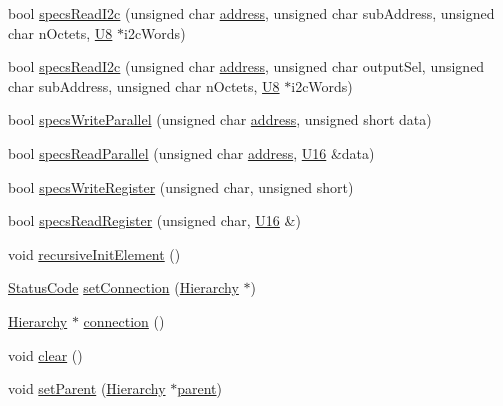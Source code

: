 \begin{DoxyCompactItemize}
\item 
bool \hyperlink{classSpecsInterface_acbc22fab91e3dbd33f83b324750baa1f}{specs\+Read\+I2c} (unsigned char \hyperlink{classSpecsInterface_a0fa039a15b842a5ba783ce825b9915d8}{address}, unsigned char sub\+Address, unsigned char n\+Octets, \hyperlink{ICECALv3_8h_a3cb25ca6f51f003950f9625ff05536fc}{U8} $\ast$i2c\+Words)
\item 
bool \hyperlink{classSpecsInterface_ad27047eaae1bc333ee0c1a6c871a407b}{specs\+Read\+I2c} (unsigned char \hyperlink{classSpecsInterface_a0fa039a15b842a5ba783ce825b9915d8}{address}, unsigned char output\+Sel, unsigned char sub\+Address, unsigned char n\+Octets, \hyperlink{ICECALv3_8h_a3cb25ca6f51f003950f9625ff05536fc}{U8} $\ast$i2c\+Words)
\item 
bool \hyperlink{classSpecsInterface_a232c39e46091c493ad9d061428dd2a8b}{specs\+Write\+Parallel} (unsigned char \hyperlink{classSpecsInterface_a0fa039a15b842a5ba783ce825b9915d8}{address}, unsigned short data)
\item 
bool \hyperlink{classSpecsInterface_aefbe6b92a9f9e2f00bf41dd8b2605c05}{specs\+Read\+Parallel} (unsigned char \hyperlink{classSpecsInterface_a0fa039a15b842a5ba783ce825b9915d8}{address}, \hyperlink{ICECALv3_8h_adf928e51a60dba0df29d615401cc55a8}{U16} \&data)
\item 
bool \hyperlink{classSpecsInterface_ab70adfa5ad87097469c7485126a3c61a}{specs\+Write\+Register} (unsigned char, unsigned short)
\item 
bool \hyperlink{classSpecsInterface_a87080bb575d1b9d0bb313c48e7d3f59a}{specs\+Read\+Register} (unsigned char, \hyperlink{ICECALv3_8h_adf928e51a60dba0df29d615401cc55a8}{U16} \&)
\item 
void \hyperlink{classElement_a3c0abcb36f8906688bb7e32608df7086}{recursive\+Init\+Element} ()
\item 
\hyperlink{classStatusCode}{Status\+Code} \hyperlink{classElement_ab476b4b1df5954141ceb14f072433b89}{set\+Connection} (\hyperlink{classHierarchy}{Hierarchy} $\ast$)
\item 
\hyperlink{classHierarchy}{Hierarchy} $\ast$ \hyperlink{classElement_af57444353c1ddf9fa0109801e97debf7}{connection} ()
\item 
void \hyperlink{classHierarchy_af4d43b0765b402670eed2d62c73405af}{clear} ()
\item 
void \hyperlink{classHierarchy_a585ad1aeec16077a0e532ab8b4fc557b}{set\+Parent} (\hyperlink{classHierarchy}{Hierarchy} $\ast$\hyperlink{classHierarchy_a1c7bec8257e717f9c1465e06ebf845fc}{parent})
\item 

\end{DoxyCompactItemize}
